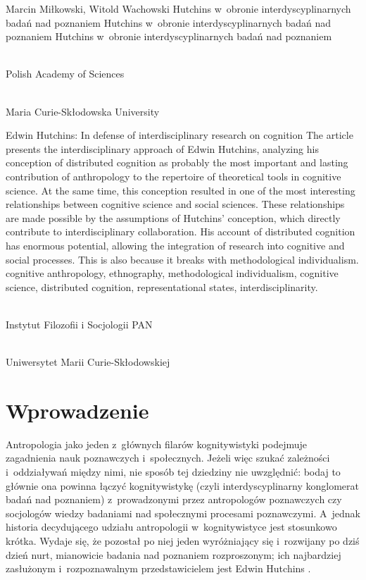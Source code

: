 \begin{artplenv2auth}{Marcin Miłkowski, Witold Wachowski}
	{Hutchins w~obronie interdyscyplinarnych badań nad poznaniem}
	{Hutchins w~obronie interdyscyplinarnych badań nad poznaniem}
	{Hutchins w~obronie interdyscyplinarnych badań nad poznaniem}
	{\flushright{}\\\subsubsectit\small{Polish Academy of Sciences}\par
		\flushright{}\\\subsubsectit\small{Maria Curie-Skłodowska University}\par}
	{Edwin Hutchins: In defense of interdisciplinary research on cognition}
	{The article presents the interdisciplinary approach of Edwin Hutchins, analyzing his conception of distributed cognition as probably the most important and lasting contribution of anthropology to the repertoire of theoretical tools in cognitive science. At the same time, this conception resulted in one of the most interesting relationships between cognitive science and social sciences. These relationships are made possible by the assumptions of Hutchins' conception, which directly contribute to interdisciplinary collaboration. His account of distributed cognition has enormous potential, allowing the integration of research into cognitive and social processes. This is also because it breaks with methodological individualism.}
	{cognitive anthropology, ethnography, methodological individualism, cognitive science, distributed cognition, representational states, interdisciplinarity.}
		{\flushright{}\\\subsubsectit\small{Instytut Filozofii i Socjologii PAN}\par
			\flushright{}\\\subsubsectit\small{Uniwersytet Marii Curie-Skłodowskiej}\par}
	
	


\section{Wprowadzenie}
\lettrine[loversize=0.13,lines=2,lraise=-0.01,nindent=0em,findent=0.2pt]%
{A}{}ntropologia jako jeden z~głównych filarów kognitywistyki podejmuje zagadnienia nauk poznawczych i~społecznych. Jeżeli więc szukać zależności i~oddziaływań między nimi, nie sposób tej dziedziny nie uwzględnić: bodaj to głównie ona powinna łączyć kognitywistykę (czyli interdyscyplinarny konglomerat badań nad poznaniem) z~prowadzonymi przez antropologów poznawczych czy socjologów wiedzy badaniami nad społecznymi procesami poznawczymi. A~jednak historia decydującego udziału antropologii w~kognitywistyce jest stosunkowo krótka. Wydaje się, że pozostał po niej jeden wyróżniający się i~rozwijany po dziś dzień nurt, mianowicie badania nad poznaniem rozproszonym; ich najbardziej zasłużonym i~rozpoznawalnym przedstawicielem jest Edwin Hutchins
\parencite*[][]{hutchins_hutchins_2022}.%





\end{artplenv2auth}
